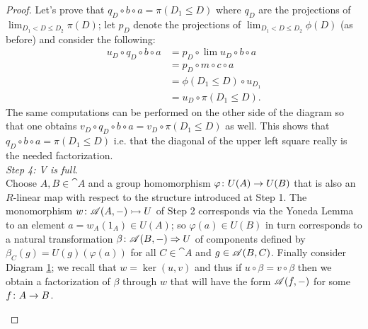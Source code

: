 \begin{proof}
  Let's prove that \(q_D\circ b\circ a = \pi(D_1\leq D)\) where \(q_D\) are the projections of \(\lim_{D_1<D\leq D_2}\pi(D)\); let \(p_D\) denote the projections of \(\lim_{D_1<D\leq D_2}\phi(D)\) (as before) and consider the following:
  \begin{align*}
    u_D\circ q_D\circ b\circ a &= p_D\circ\lim u_D\circ b\circ a\\
                               &= p_D\circ m\circ c\circ a\\
                               &= \phi(D_1\leq D)\circ u_{D_1}\\
                               &= u_D\circ\pi(D_1\leq D).
  \end{align*}
  The same computations can be performed on the other side of the diagram so that one obtains \(v_D\circ q_D\circ b\circ a = v_D\circ\pi(D_1\leq D)\) as well. This shows that \(q_D\circ b\circ a = \pi(D_1\leq D)\) i.e. that the diagonal of the upper left square really is the needed factorization.\\

  \noindent\emph{Step 4: V is full}.\\

  \noindent Choose \(A,B\in\cat{A}\) and a group homomorphism \(\varphi\colon U(A)\to U(B)\) that is also an \(R\)-linear map with respect to the structure introduced at Step 1. The monomorphism \(w\colon{\mathscr A}(A,-)\rightarrowtail U\) of Step 2 corresponds via the Yoneda Lemma to an element \(a = w_A(1_A)\in U(A)\); so \(\varphi(a)\in U(B)\) in turn corresponds to a natural transformation \(\beta\colon {\mathscr A}(B,-)\Rightarrow U\) of components defined by \(\beta_C(g) = U(g)(\varphi(a))\) for all \(C\in\cat{A}\) and \(g\in{\mathscr A}(B,C)\). Finally consider Diagram \ref{diagram:facto}; we recall that \(w = \ker(u, v)\) and thus if \(u\circ\beta = v\circ\beta\) then we obtain a factorization of \(\beta\) through \(w\) that will have the form \({\mathscr A}(f,-)\) for some \(f\colon A\to B\).

  \begin{figure}[ht]
    \begin{center}
    \end{center}
    \caption{}
    \label{diagram:facto}
  \end{figure}


\end{proof}
